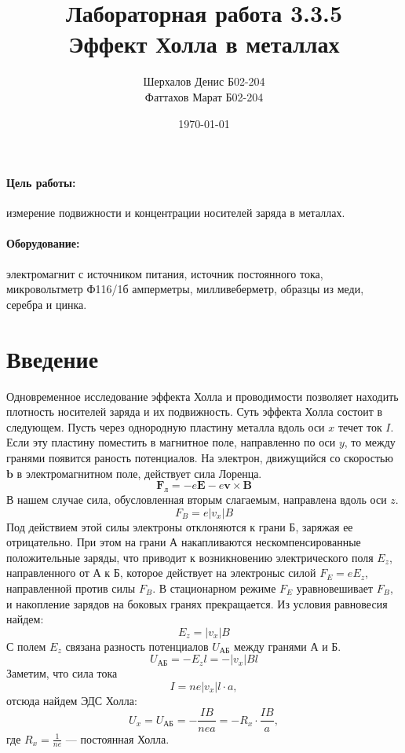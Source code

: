 \documentclass[a4paper,12pt]{article}
\author{Шерхалов Денис Б02-204 \\
        Фаттахов Марат Б02-204}
\title{Лабораторная работа 3.3.5 \\
	\textbf{Эффект Холла в металлах}}
\date{\today}
\theoremstyle{definition}
\begin{document}
	
{\Large \maketitle}

\paragraph*{Цель работы:} измерение подвижности и концентрации носителей заряда в металлах.
\paragraph*{Оборудование:} электромагнит с источником питания, источник постоянного тока, микровольтметр Ф116/1б амперметры, милливеберметр, образцы из меди, серебра и цинка.

\section{Введение}
	Одновременное исследование эффекта Холла и проводимости позволяет находить плотность носителей заряда и их подвижность. Суть эффекта Холла состоит в следующем. Пусть через однородную пластину металла вдоль оси $x$ течет ток $I$. Если эту пластину поместить в магнитное поле, направленно по оси $y$, то между гранями появится раность потенциалов. На электрон, движущийся со скоростью $\mathbf{b}$ в электромагнитном поле, действует сила Лоренца.
		\begin{equation}
			\mathbf{F_\text{л}} = -e\mathbf{E} - e\mathbf{v} \times \mathbf{B}
		\end{equation}
		В нашем случае сила, обусловленная вторым слагаемым, направлена вдоль оси $z$.
		\begin{equation}
			F_B = e\left|v_x\right|B
		\end{equation}
		Под действием этой силы электроны отклоняются к грани Б, заряжая ее отрицательно. При этом на грани А накапливаются нескомпенсированные положительные заряды, что приводит к возникновению электрического поля $E_z$, направленного от А к Б, которое действует на электроныс силой $F_E = eE_z$, направленной против силы $F_B$.  В стационарном режиме $F_E$ уравновешивает $F_B$, и накопление зарядов на боковых гранях прекращается. Из условия равновесия найдем:
		\begin{equation}
			E_z = \left|v_x\right|B
		\end{equation}
		С полем $E_z$ связана разность потенциалов $U_{\text{АБ}}$ между гранями А и Б.
		\begin{equation}
			U_{\text{АБ}} = - E_zl = - \left|v_x\right|Bl
		\end{equation}
		Заметим, что сила тока
		\begin{equation}
			I = ne\left|v_x\right|l\cdot a,
		\end{equation}
		отсюда найдем ЭДС Холла:
		\begin{equation}
			U_x = U_{\text{АБ}} = -\frac{IB}{nea} = -R_x\cdot\frac{IB}{a},
		\end{equation}
		где $R_x = \frac{1}{n e}$ --- постоянная Холла.
\end{document}
